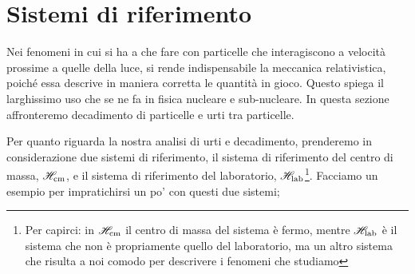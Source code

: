 \section{ Sistemi di riferimento}
Nei fenomeni in cui si ha a che fare con particelle che
interagiscono a velocit\`a prossime a quelle della luce, si rende
indispensabile la meccanica relativistica, poich\'e essa
descrive in maniera corretta le quantit\`a in gioco.
Questo spiega il larghissimo uso che se ne fa in
fisica nucleare e sub-nucleare. In questa sezione
affronteremo decadimento di particelle e urti tra
particelle.


Per quanto riguarda la nostra analisi di urti e decadimento,
prenderemo in considerazione due sistemi di riferimento, il
sistema di riferimento del centro di massa, $\mathscr{H}_{\mathrm{cm}}$, e il sistema
di riferimento del laboratorio, $\mathscr{H}_{\mathrm{lab}}$\footnote{ Per capirci: in
$\mathscr{H}_{\mathrm{cm}}$ il centro di massa del sistema \`e fermo, mentre $\mathscr{H}_{\mathrm{lab}}$ \`e
il sistema che non \`e propriamente quello del laboratorio, ma un
altro sistema che risulta a noi comodo per descrivere i fenomeni
che studiamo}. Facciamo un esempio per impratichirsi un po' con
questi due sistemi;

